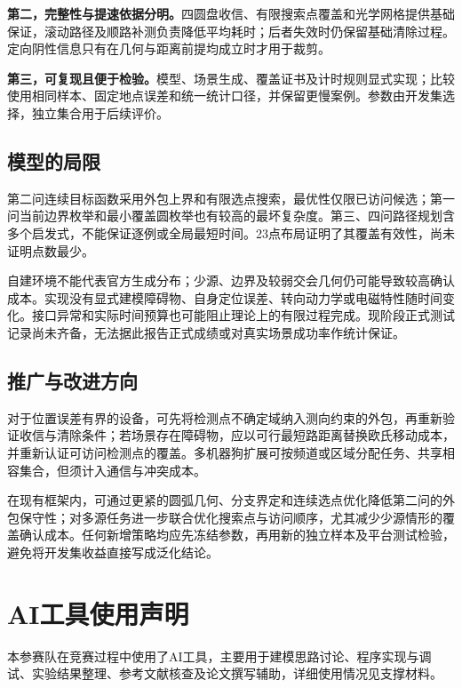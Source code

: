 \documentclass{JXUSTmodeling}
\begin{document}
\textbf{第二，完整性与提速依据分明。}四圆盘收信、有限搜索点覆盖和光学网格提供基础保证，滚动路径及顺路补测负责降低平均耗时；后者失效时仍保留基础清除过程。定向阴性信息只有在几何与距离前提均成立时才用于裁剪。

\textbf{第三，可复现且便于检验。}模型、场景生成、覆盖证书及计时规则显式实现；比较使用相同样本、固定地点误差和统一统计口径，并保留更慢案例。参数由开发集选择，独立集合用于后续评价。

\subsection{模型的局限}
第二问连续目标函数采用外包上界和有限选点搜索，最优性仅限已访问候选；第一问当前边界枚举和最小覆盖圆枚举也有较高的最坏复杂度。第三、四问路径规划含多个启发式，不能保证逐例或全局最短时间。23点布局证明了其覆盖有效性，尚未证明点数最少。

自建环境不能代表官方生成分布；少源、边界及较弱交会几何仍可能导致较高确认成本。实现没有显式建模障碍物、自身定位误差、转向动力学或电磁特性随时间变化。接口异常和实际时间预算也可能阻止理论上的有限过程完成。现阶段正式测试记录尚未齐备，无法据此报告正式成绩或对真实场景成功率作统计保证。

\subsection{推广与改进方向}
对于位置误差有界的设备，可先将检测点不确定域纳入测向约束的外包，再重新验证收信与清除条件；若场景存在障碍物，应以可行最短路距离替换欧氏移动成本，并重新认证可访问检测点的覆盖。多机器狗扩展可按频道或区域分配任务、共享相容集合，但须计入通信与冲突成本。

在现有框架内，可通过更紧的圆弧几何、分支界定和连续选点优化降低第二问的外包保守性；对多源任务进一步联合优化搜索点与访问顺序，尤其减少少源情形的覆盖确认成本。任何新增策略均应先冻结参数，再用新的独立样本及平台测试检验，避免将开发集收益直接写成泛化结论。

\section*{AI工具使用声明}
本参赛队在竞赛过程中使用了AI工具，主要用于建模思路讨论、程序实现与调试、实验结果整理、参考文献核查及论文撰写辅助，详细使用情况见支撑材料。
\end{document}
